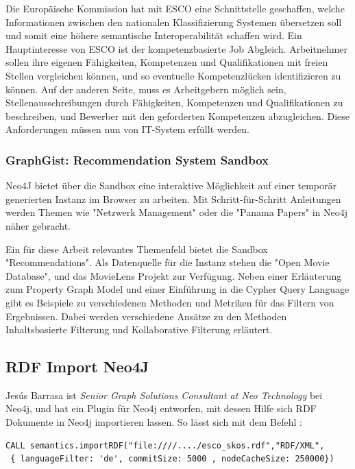 Die Europäische Kommission hat mit ESCO eine Schnittstelle geschaffen, welche Informationen zwischen den nationalen Klassifizierung Systemen übersetzen soll und somit eine höhere semantische Interoperabilität schaffen wird. Ein Hauptinteresse von ESCO ist der kompetenzbasierte Job Abgleich. Arbeitnehmer sollen ihre eigenen Fähigkeiten, Kompetenzen und Qualifikationen mit freien Stellen vergleichen können, und so eventuelle Kompetenzlücken identifizieren zu können. Auf der anderen Seite, muss es Arbeitgebern möglich sein, Stellenausschreibungen durch  Fähigkeiten, Kompetenzen und Qualifikationen zu beschreiben, und Bewerber mit den geforderten Kompetenzen abzugleichen. Diese Anforderungen müssen nun von IT-System erfüllt werden. 


\subsubsection{GraphGist: Recommendation System Sandbox}\label{recommender}

Neo4J bietet über die Sandbox eine interaktive Möglichkeit auf einer temporär generierten Instanz im Browser zu arbeiten. Mit Schritt-für-Schritt Anleitungen werden Themen wie "Netzwerk Management" oder die "Panama Papers" in Neo4j näher gebracht. 

Ein für diese Arbeit relevantes Themenfeld bietet die Sandbox "Recommendations".\cite{neo4j} Als Datenquelle für die Instanz stehen die "Open Movie Database"\cite{omdb}, und das MovieLens Projekt\cite{grouplens_2016} zur Verfügung.
Neben einer Erläuterung zum Property Graph Model und einer Einführung in die Cypher Query Language gibt es Beispiele zu verschiedenen Methoden und Metriken für das Filtern von Ergebnissen. Dabei werden verschiedene Ansätze zu den Methoden Inhaltsbasierte Filterung und Kollaborative Filterung erläutert. 
\subsection{RDF Import Neo4J}

Jesús Barrasa ist  \textit{Senior Graph Solutions Consultant at Neo Technology} bei Neo4j, und hat ein Plugin für Neo4j entworfen, mit dessen Hilfe sich RDF Dokumente in Neo4j importieren lassen. So lässt sich mit dem Befehl :
\vspace{1em}

\begin{lstlisting}[frame=htrbl, caption={Das Listing zeigt einen Funktionsaufruf über die Neo4j}, label={lst:result2}]
CALL semantics.importRDF("file:////..../esco_skos.rdf","RDF/XML",
 { languageFilter: 'de', commitSize: 5000 , nodeCacheSize: 250000})	
\end{lstlisting}

